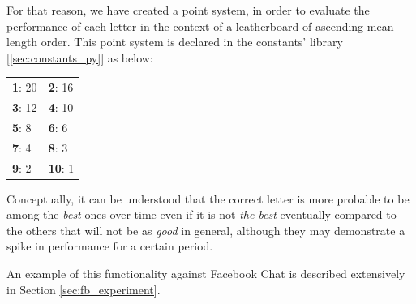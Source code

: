 For that reason, we have created a point system, in order to evaluate the
performance of each letter in the context of a leatherboard of ascending mean
length order. This point system is declared in the constants' library
[\ref{sec:constants_py}] as below:

\begin{table}[H] \centering \begin{tabular} { | l | l | } \hline \textbf{1}: 20
& \textbf{2}: 16 \\ \textbf{3}: 12 & \textbf{4}: 10 \\ \textbf{5}: 8 &
\textbf{6}: 6 \\ \textbf{7}: 4 & \textbf{8}: 3 \\ \textbf{9}: 2 & \textbf{10}: 1
\\ \hline \end{tabular} \end{table}

Conceptually, it can be understood that the correct letter is more probable to
be among the \textit{best} ones over time even if it is not \textit{the best}
eventually compared to the others that will not be as \textit{good} in general,
although they may demonstrate a spike in performance for a certain period.

An example of this functionality against Facebook Chat is described extensively
in Section \ref{sec:fb_experiment}.
